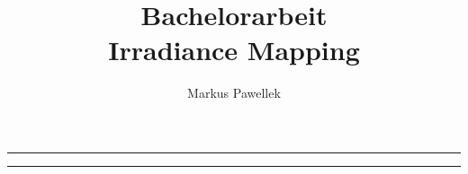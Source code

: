 

\title{Bachelorarbeit \\ Irradiance Mapping}
\author{Markus Pawellek}
\newcommand{\email}{markuspawellek@gmail.com}

\usepackage[mathscr]{euscript}

\newcommand{\ssp}[1][2]{\mathscr{S}^{#1}}
\newcommand{\shs}[2][2]{\mathscr{H}^{#1}_{#2}}

\usepackage{tabularx}

\let\stdsection\section
\renewcommand*\section{\thispagestyle{titlestyle}\stdsection}

\usepackage{emptypage}

\renewcommand*{\thefootnote}{\arabic{footnote}}
\setcounter{footnote}{0}



	

	\pagestyle{contentstyle}

	\cleardoublepage

	\hrule
	\medskip
	\begin{abstract}
		\itshape
		
	\end{abstract}
	\medskip
	\hrule
	\bigskip

	\tableofcontents

	\cleardoublepage
	\listoffigures

	\cleardoublepage
	

	\cleardoublepage
	\pagestyle{mainstyle}

	\cleardoublepage
	
	\cleardoublepage
	
	\cleardoublepage
	
	\cleardoublepage
	
	\cleardoublepage
	

